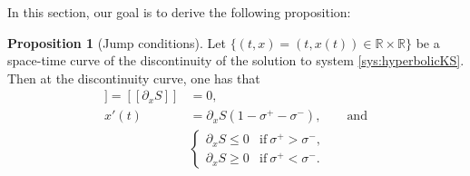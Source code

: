 \documentclass[12pt]{article}
\theoremstyle{definition}
\newtheorem{proposition}[theorem]{Proposition}
\theoremstyle{remark}
\newcommand{\dx}{\partial_x}
\numberwithin{equation}{section}
\begin{document}
In this section, our goal is to derive the following proposition:
\begin{proposition}[Jump conditions]
    \label{prop:jump-entropy}
    Let $ \lbrace (t,x) = (t,x(t)) \in \mathbb R \times \mathbb R \rbrace $ be a space-time curve of the discontinuity of the solution to system \eqref{sys:hyperbolicKS}. Then at the discontinuity curve, one has that
    \begin{align}
        [[S]] = [[\dx S]] & = 0, \label{eq:jump-1} \\
        x'(t) & = \dx S(1- \sigma^+ - \sigma^-), \label{eq:jump-2} \qquad \text{and} \\
        \label{eq:jump-3}& \begin{cases}
            \dx S \leq 0 & \text{if} \ \sigma^+ > \sigma^-,\\
            \dx S \geq 0 & \text{if} \ \sigma^+ < \sigma^-.
        \end{cases}
    \end{align}
\end{proposition}
\end{document}
